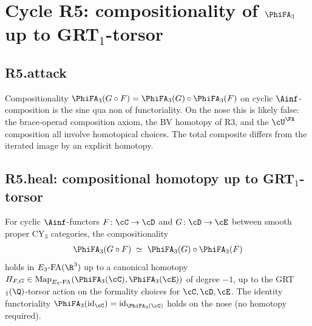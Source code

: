 \section*{Cycle R5: compositionality of $\PhiFA_3$ up to GRT$_1$-torsor}

\subsection*{R5.attack}

Compositionality
$\PhiFA_3(G \circ F) = \PhiFA_3(G) \circ \PhiFA_3(F)$
on cyclic $\Ainf$-composition is the sine qua non of functoriality.  On
the nose this is likely false: the brace-operad composition axiom,
the BV homotopy of R3, and the $\cU^\FA$ composition all involve
homotopical choices.  The total composite differs from the iterated
image by an explicit homotopy.

\subsection*{R5.heal: compositional homotopy up to GRT$_1$-torsor}

\begin{proposition}
\label{prop:phi-fa-3-inf1-functor-grt1}
\ClaimStatusProvedHere
For cyclic $\Ainf$-functors $F \colon \cC \to \cD$ and
$G \colon \cD \to \cE$ between smooth proper CY$_3$ categories, the
compositionality
\[
  \PhiFA_3(G \circ F) \;\simeq\; \PhiFA_3(G) \circ \PhiFA_3(F)
\]
holds in $E_3\text{-FA}(\R^3)$ up to a canonical homotopy
$H_{F,G} \in \mathrm{Map}_{E_3\text{-FA}}(\PhiFA_3(\cC),
\PhiFA_3(\cE))$ of degree $-1$, up to the GRT$_1(\Q)$-torsor action
on the formality choices for $\cC, \cD, \cE$.  The identity
functoriality $\PhiFA_3(\mathrm{id}_\cC) = \mathrm{id}_{\PhiFA_3(\cC)}$
holds on the nose (no homotopy required).
\end{proposition}

